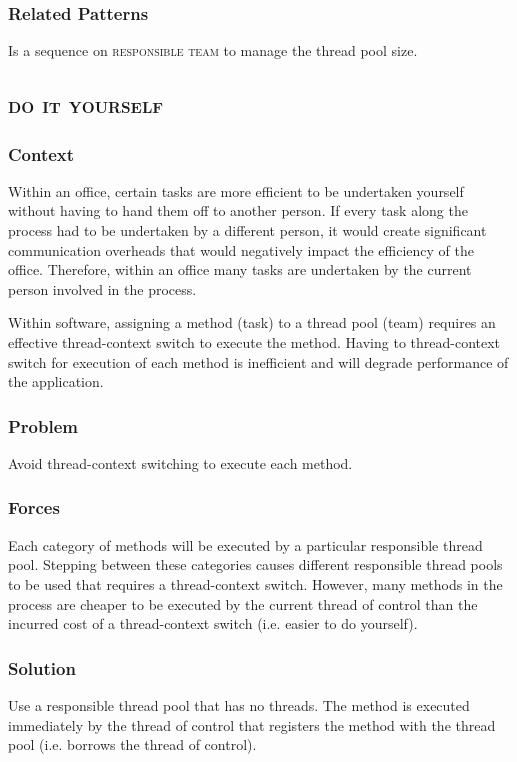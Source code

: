 \documentclass[prodmode]{style/acmlarge}
\begin{document}
\subsubsection*{Related Patterns} Is a sequence on \textsc{responsible team} to
manage the thread pool size.



\subsection{\textsc{\textbf{do it yourself}}}

\subsubsection*{Context} Within an office, certain tasks are more efficient to
be undertaken yourself without having to hand them off to another person.  If
every task along the process had to be undertaken by a different person, it
would create significant communication overheads that would negatively impact
the efficiency of the office.  Therefore, within an office many tasks are
undertaken by the current person involved in the process.

Within software, assigning a method (task) to a thread pool (team) requires an
effective thread-context switch to execute the method.  Having to thread-context
switch for execution of each method is inefficient and will degrade performance
of the application.

\subsubsection*{\textbf{Problem}} Avoid thread-context switching to execute each method.

\subsubsection*{Forces} Each category of methods will be executed by a
particular responsible thread pool.  Stepping between these categories causes
different responsible thread pools to be used that requires a thread-context
switch.  However, many methods in the process are cheaper to be executed by the
current thread of control than the incurred cost of a thread-context switch
(i.e. easier to do yourself).

\subsubsection*{\textbf{Solution}} Use a responsible thread pool that has no threads.
The method is executed immediately by the thread of control that registers the
method with the thread pool (i.e. borrows the thread of control).
\end{document}
